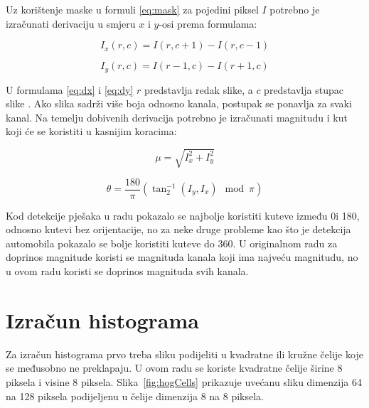 \documentclass[times, utf8, zavrsni]{fer}
\begin{document}
\begin{equation}
	[-1, 0, 1]
	\label{eq:mask}
\end{equation}

Uz korištenje maske u formuli \ref{eq:mask} za pojedini piksel \(I\) potrebno je izračunati derivaciju u smjeru \(x\) i \(y\)-osi prema formulama:

\begin{equation}
I_x(r, c) = I(r, c + 1) - I(r, c - 1)
\label{eq:dx}
\end{equation}

\begin{equation}
I_y(r, c) = I(r - 1, c) - I(r + 1, c)
\label{eq:dy}
\end{equation}

U formulama \ref{eq:dx} i \ref{eq:dy} \(r\) predstavlja redak slike, a \(c\) predstavlja stupac slike \citep{tomasi2012histograms}. Ako slika sadrži više boja odnosno kanala, postupak se ponavlja za svaki kanal. Na temelju dobivenih derivacija potrebno je izračunati magnitudu i kut koji će se koristiti u kasnijim koracima:

\begin{equation}
\mu = \sqrt{I_x^2 + I_y^2}
\label{eq:mag}
\end{equation}

\begin{equation}
\theta = \frac{180}{\pi}(\tan_2^{-1}(I_y, I_x) \mod \pi)
\label{eq:ang}
\end{equation}

Kod detekcije pješaka u radu \cite{dalal2005histograms} pokazalo se najbolje koristiti kuteve između 0\degree i 180\degree, odnosno kutevi bez orijentacije, no za neke druge probleme kao što je detekcija automobila pokazalo se bolje koristiti kuteve do 360\degree \citep{dalal2005histograms}. U originalnom radu za doprinos magnitude koristi se magnituda kanala koji ima najveću magnitudu, no u ovom radu koristi se doprinos magnituda svih kanala.

\section{Izračun histograma}
Za izračun histograma prvo treba sliku podijeliti u kvadratne ili kružne čelije koje se međusobno ne preklapaju. U ovom radu se koriste kvadratne čelije širine 8 piksela i visine 8 piksela. Slika~\ref{fig:hogCells} prikazuje uvećanu sliku dimenzija 64 na 128 piksela podijeljenu u čelije dimenzija 8 na 8 piksela.
\end{document}
